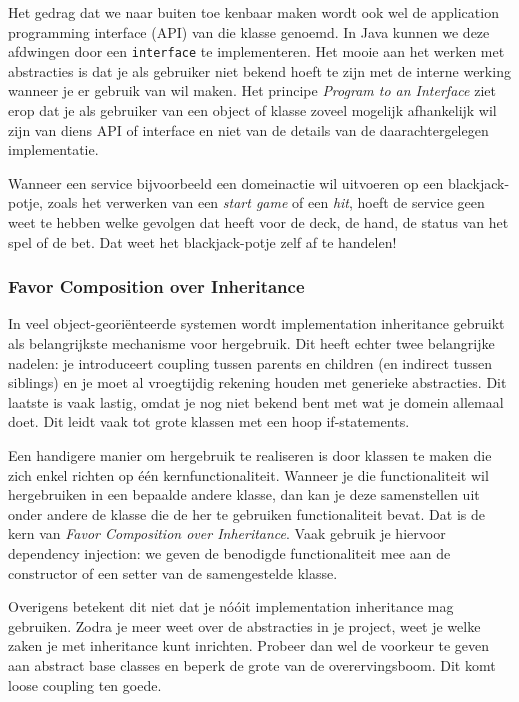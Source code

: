 Het gedrag dat we naar buiten toe kenbaar maken wordt ook wel de 
application programming interface (API) van die klasse genoemd.
In Java kunnen we deze afdwingen door een \texttt{interface} te implementeren.
Het mooie aan het werken met abstracties is dat je als gebruiker niet bekend hoeft 
te zijn met de interne werking wanneer je er gebruik van wil maken.
Het principe \textit{Program to an Interface} 
ziet erop dat je als gebruiker van een object of 
klasse zoveel mogelijk afhankelijk wil zijn van diens 
API of interface en niet van de details van 
de daarachtergelegen implementatie.

Wanneer een service bijvoorbeeld een domeinactie wil uitvoeren op een blackjack-potje, zoals het 
verwerken van een \textit{start game} of een \textit{hit}, 
hoeft de service geen weet te hebben welke gevolgen dat heeft voor 
de deck, de hand, de status van het spel of de bet. 
Dat weet het blackjack-potje zelf af te handelen!

\subsubsection{Favor Composition over Inheritance}
In veel object-georiënteerde systemen wordt implementation inheritance
gebruikt als belangrijkste mechanisme voor hergebruik. Dit heeft echter
twee belangrijke nadelen: je introduceert coupling tussen parents en children 
(en indirect tussen siblings) en je moet al vroegtijdig rekening houden met 
generieke abstracties. Dit laatste is vaak lastig, omdat je nog niet bekend 
bent met wat je domein allemaal doet. Dit leidt vaak tot grote klassen met 
een hoop if-statements.

Een handigere manier om hergebruik te realiseren is door klassen 
te maken die zich enkel richten op één kernfunctionaliteit.
Wanneer je die functionaliteit wil hergebruiken in een bepaalde
andere klasse, dan kan je deze samenstellen uit onder andere de klasse die 
de her te gebruiken functionaliteit bevat. Dat is de kern van 
\textit{Favor Composition over Inheritance}.
Vaak gebruik je hiervoor dependency injection:
we geven de benodigde functionaliteit mee aan de constructor of een setter
van de samengestelde klasse.

Overigens betekent dit niet dat je nóóit implementation inheritance mag gebruiken.
Zodra je meer weet over de abstracties in je project, weet je welke zaken je 
met inheritance kunt inrichten. Probeer dan wel de voorkeur te geven aan abstract base classes
en beperk de grote van de overervingsboom. Dit komt loose coupling ten goede.


